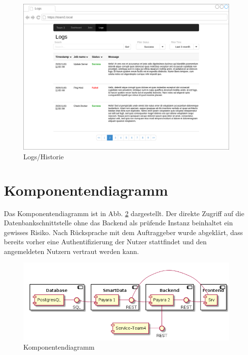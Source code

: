 \documentclass[a4paper,10pt]{article}
\begin{document}
\begin{figure}[!htb]
	\centering
	\includegraphics[width=\textwidth]{../Mock-Ups/mockup-logs}
	\caption{Logs/Historie}
	\label{logs}
\end{figure}



\section{Komponentendiagramm}
Das Komponentendiagramm ist in Abb. \ref{komponentendiagramm} dargestellt. Der direkte Zugriff auf die Datenbankschnittstelle ohne das Backend als prüfende Instanz beinhaltet ein gewisses Risiko. Nach Rücksprache mit dem Auftraggeber wurde abgeklärt, dass bereits vorher eine Authentifizierung der Nutzer stattfindet und den angemeldeten Nutzern vertraut werden kann.
\begin{figure}[!htb]
	\centering
	\includegraphics[width=\textwidth]{../Components}
	\caption{Komponentendiagramm}
	\label{komponentendiagramm}
\end{figure}
\end{document}
